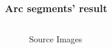 \documentclass{beamer}
\begin{document}
    \begin{frame}
        \frametitle{Arc segments' result}
    
        \begin{columns}
            \begin{column}{.5\linewidth}
                \begin{figure}[htbp]
                    \centering
                    \quad
                    \caption{Source Images}
                \end{figure}
            \end{column}
            \begin{column}{.5\linewidth}
                \begin{figure}[htbp]
                    \centering
                    \subfigure{
}
\end{figure}
\end{column}
\end{columns}
\end{frame}
\end{document}
